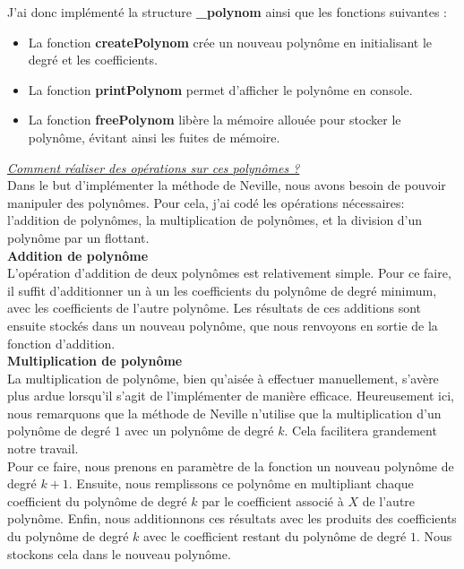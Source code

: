 \documentclass{report}
\begin{document}
J'ai donc implémenté la structure \textbf{\_polynom} ainsi que les fonctions suivantes :\vspace{2pt}\\
\begin{itemize}
    \item La fonction \textbf{createPolynom} crée un nouveau polynôme en initialisant le degré et les coefficients.
    \item La fonction \textbf{printPolynom} permet d'afficher le polynôme en console.
    \item La fonction \textbf{freePolynom} libère la mémoire allouée pour stocker le polynôme, évitant ainsi les fuites de mémoire.\\
\end{itemize}
\underline{\textit{Comment réaliser des opérations sur ces polynômes ?}}\vspace{4pt}\\
Dans le but d'implémenter la méthode de Neville, nous avons besoin de pouvoir manipuler des polynômes. Pour cela, j'ai codé les opérations nécessaires: l'addition de polynômes, la multiplication de polynômes, et la division d'un polynôme par un flottant.\vspace{4pt}\\
\textbf{Addition de polynôme}\\
L'opération d'addition de deux polynômes est relativement simple. Pour ce faire, il suffit d'additionner un à un les coefficients du polynôme de degré minimum, avec les coefficients de l'autre polynôme. Les résultats de ces additions sont ensuite stockés dans un nouveau polynôme, que nous renvoyons en sortie de la fonction d'addition.\vspace{4pt}\\
\textbf{Multiplication de polynôme}\\
La multiplication de polynôme, bien qu'aisée à effectuer manuellement, s'avère plus ardue lorsqu'il s'agit de l'implémenter de manière efficace. Heureusement ici, nous remarquons que la méthode de Neville n'utilise que la multiplication d'un polynôme de degré $1$ avec un polynôme de degré $k$. Cela facilitera grandement notre travail.\\
Pour ce faire, nous prenons en paramètre de la fonction un nouveau polynôme de degré $k+1$. Ensuite, nous remplissons ce polynôme en multipliant chaque coefficient du polynôme de degré $k$ par le coefficient associé à $X$ de l'autre polynôme. Enfin, nous additionnons ces résultats avec les produits des coefficients du polynôme de degré $k$ avec le coefficient restant du polynôme de degré $1$. Nous stockons cela dans le nouveau polynôme.\vspace{2pt}\\
\end{document}
